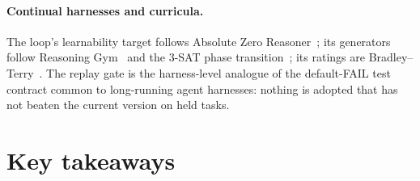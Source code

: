 \documentclass[11pt,a4paper]{article}
\begin{document}
\paragraph{Continual harnesses and curricula.} The loop's learnability target
follows Absolute Zero Reasoner~\citep{zhao2025absolutezero}; its generators
follow Reasoning Gym~\citep{stojanovski2025reasoninggym} and the 3-SAT phase
transition~\citep{mitchell1992hard}; its ratings are
Bradley--Terry~\citep{bradley1952rank}. The replay gate is the harness-level
analogue of the default-FAIL test contract common to long-running agent
harnesses: nothing is adopted that has not beaten the current version on held
tasks.

\section{Key takeaways}
\label{sec:takeaways}
\end{document}
